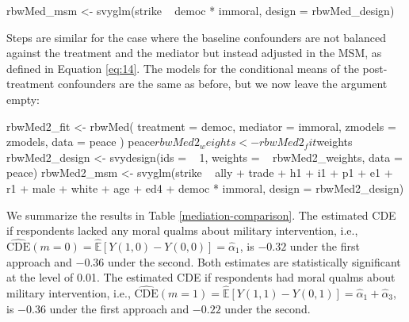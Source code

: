 \begin{Schunk}
\begin{Sinput}
rbwMed_msm <- svyglm(strike ~ democ * immoral,
                     design = rbwMed_design)
\end{Sinput}
\end{Schunk}

Steps are similar for the case where the baseline confounders are not
balanced against the treatment and the mediator but instead adjusted in
the MSM, as defined in Equation \ref{eq:14}. The models for the
conditional means of the post-treatment confounders are the same as
before, but we now leave the  argument empty:

\begin{Schunk}
\begin{Sinput}
rbwMed2_fit <- rbwMed(
  treatment = democ,
  mediator = immoral,
  zmodels = zmodels,
  data = peace
)
peace$rbwMed2_weights <- rbwMed2_fit$weights
rbwMed2_design <- svydesign(ids = ~ 1,
                            weights = ~ rbwMed2_weights,
                            data = peace)
rbwMed2_msm <- svyglm(strike ~ ally + trade + h1 + i1 + p1 +
                        e1 + r1 + male + white + age + ed4 + democ * immoral,
                      design = rbwMed2_design)
\end{Sinput}
\end{Schunk}

We summarize the results in Table \ref{mediation-comparison}. The
estimated CDE if respondents lacked any moral qualms about military
intervention, i.e.,
\(\widehat{\text{CDE}}(m=0)=\hat{\mathbb{E}}[Y(1,0)-Y(0,0)]=\hat{\alpha}_{1}\),
is \(-0.32\) under the first approach and \(-0.36\) under the second.
Both estimates are statistically significant at the level of 0.01. The
estimated CDE if respondents had moral qualms about military
intervention, i.e.,
\(\widehat{\text{CDE}}(m=1)=\hat{\mathbb{E}}[Y(1,1)-Y(0,1)]=\hat{\alpha}_{1} + \hat{\alpha}_{3}\),
is \(-0.36\) under the first approach and \(-0.22\) under the second.

